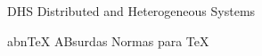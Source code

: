 
\begin{siglas}
  \item[DHS] Distributed and Heterogeneous Systems
  \item[abnTeX] ABsurdas Normas para TeX
\end{siglas}
